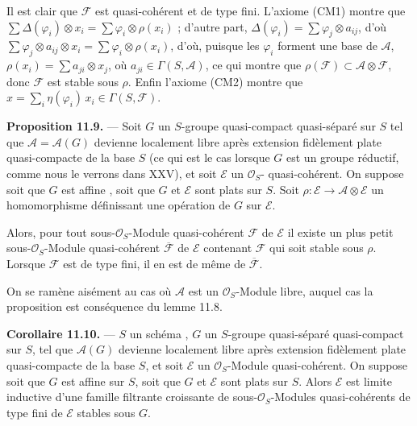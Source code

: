 \documentclass[11pt,a4paper]{article}
\begin{document}
 Il est clair que $\mathcal{F}$ est quasi-cohérent et de type
fini. L'axiome (CM1) montre que
$\sum \Delta(\varphi_{i}) \otimes x_{i}
= \sum \varphi_{i} \otimes \rho(x_{i})$ ; d'autre part,
$\Delta(\varphi_{i}) = \sum \varphi_{j} \otimes a_{ij}$, d'où
$\sum \varphi_{j} \otimes a_{ij} \otimes x_{i}
= \sum \varphi_{i} \otimes \rho(x_{i})$, d'où, puisque les $\varphi_{i}$
forment une base de $\mathcal{A}$,
$\rho(x_{i}) = \sum a_{ji} \otimes x_{j}$, où
$a_{ji} \in \Gamma(S, \mathcal{A})$, ce qui montre que
$\rho(\mathcal{F}) \subset \mathcal{A} \otimes \mathcal{F}$, donc
$\mathcal{F}$ est stable sous $\rho$. Enfin l'axiome (CM2) montre que
$x = \sum_{i} \eta(\varphi_{i})\, x_{i} \in \Gamma(S, \mathcal{F})$.

\textbf{Proposition 11.9.} — Soit $G$ un $S$-groupe quasi-compact
quasi-séparé sur $S$ tel que $\mathcal{A} = \mathcal{A}(G)$ devienne
localement libre après extension fidèlement plate quasi-compacte de la base
$S$ (ce qui est le cas  lorsque $G$ est un groupe
réductif, comme nous le verrons dans \struck{\ill{}} XXV), et soit
$\mathcal{E}$ un $\mathcal{O}_{S}$- quasi-cohérent. On
suppose soit que $G$ est affine , soit que $G$ et
$\mathcal{E}$ sont plats sur $S$. Soit
$\rho : \mathcal{E} \longrightarrow \mathcal{A} \otimes \mathcal{E}$ un
homomorphisme définissant une opération de $G$ sur $\mathcal{E}$.

Alors, pour tout sous-$\mathcal{O}_{S}$-Module quasi-cohérent
$\mathcal{F}$ de $\mathcal{E}$ il existe un plus petit
sous-$\mathcal{O}_{S}$-Module quasi-cohérent $\overline{\mathcal{F}}$ de
$\mathcal{E}$ contenant $\mathcal{F}$ qui soit stable sous $\rho$. Lorsque
$\mathcal{F}$ est de type \struck{\ill{}} fini, il en est de même de
$\overline{\mathcal{F}}$.


On se ramène aisément  au cas où
$\mathcal{A}$ est un $\mathcal{O}_{S}$-Module libre, auquel cas la
proposition est conséquence du lemme 11.8.

\textbf{Corollaire 11.10.} —  $S$ un
schéma , $G$ un $S$-groupe quasi-séparé
 quasi-compact sur $S$, tel que $\mathcal{A}(G)$ devienne
\struck{\ill{}} localement libre après extension fidèlement plate
quasi-compacte de la base $S$, et soit $\mathcal{E}$ un
$\mathcal{O}_{S}$-Module quasi-cohérent. On suppose soit que $G$ est
affine sur $S$, soit que $G$ et $\mathcal{E}$ sont plats sur $S$.  Alors $\mathcal{E}$ est
limite inductive d'une famille filtrante croissante de
sous-$\mathcal{O}_{S}$-Modules quasi-cohérents de type fini de
$\mathcal{E}$ stables sous $G$.
\end{document}

